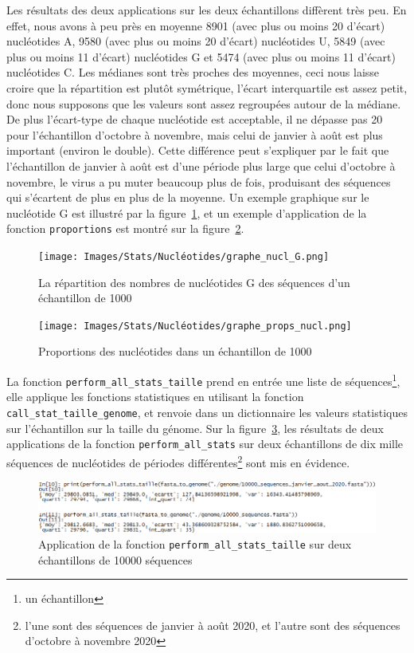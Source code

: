 \documentclass[12pt]{article}
\begin{document}
Les résultats des deux applications sur les deux échantillons diffèrent très peu. En effet, nous avons à peu près en moyenne 8901 (avec plus ou moins 20 d'écart) nucléotides A, 9580 (avec plus ou moins 20 d'écart)  nucléotides U, 5849 (avec plus ou moins 11 d'écart)  nucléotides G et 5474 (avec plus ou moins 11 d'écart) nucléotides C. Les médianes sont très proches des moyennes, ceci nous laisse croire que la répartition est plutôt symétrique, l'écart interquartile est assez petit, donc nous supposons que les valeurs sont assez regroupées autour de la médiane. De plus l'écart-type de chaque nucléotide est acceptable, il ne dépasse pas 20 pour l'échantillon d'octobre à novembre, mais celui de janvier à août est plus important (environ le double). Cette différence peut s'expliquer par le fait que l'échantillon de janvier à août est d'une période plus large que celui d'octobre à novembre, le virus a pu muter beaucoup plus de fois, produisant des séquences qui s'écartent de plus en plus de la moyenne. Un exemple graphique sur le nucléotide G est illustré par la figure~\ref{graph:nuclG}, et un exemple d'application de la fonction \texttt{proportions} est montré sur la figure~\ref{graph:propnucl}.

    \begin{figure}[!h]
        \centering
        \texttt{[image: Images/Stats/Nucléotides/graphe\_nucl\_G.png]}
        \caption{La répartition des nombres de nucléotides G des séquences d'un échantillon de 1000}      \label{graph:nuclG}
    \end{figure}
    \begin{figure}[!h]
        \centering
        \texttt{[image: Images/Stats/Nucléotides/graphe\_props\_nucl.png]}
        \caption{Proportions des nucléotides dans un échantillon de 1000}      \label{graph:propnucl}
    \end{figure}

La fonction \texttt{perform\_all\_stats\_taille} prend en entrée une liste de séquences\footnote{un échantillon}, elle applique les fonctions statistiques en utilisant la fonction \texttt{call\_stat\_taille\_genome}, et renvoie dans un dictionnaire les valeurs statistiques sur l'échantillon sur la taille du génome. Sur la figure~\ref{apptaille10000seq}, les résultats de deux applications de la fonction \texttt{perform\_all\_stats} sur deux échantillons de dix mille séquences de nucléotides de périodes différentes\footnote{l'une sont des séquences de janvier à août 2020, et l'autre sont des séquences d'octobre à novembre 2020} sont mis en évidence.
    \begin{figure}[!h]
        \centering
        \includegraphics[scale = 0.8]{Images/Stats/app_10000_seq_taille.PNG}
        \caption{Application de la fonction \texttt{perform\_all\_stats\_taille} sur deux échantillons de 10000 séquences}
        \label{apptaille10000seq}
    \end{figure}
    
\end{document}

